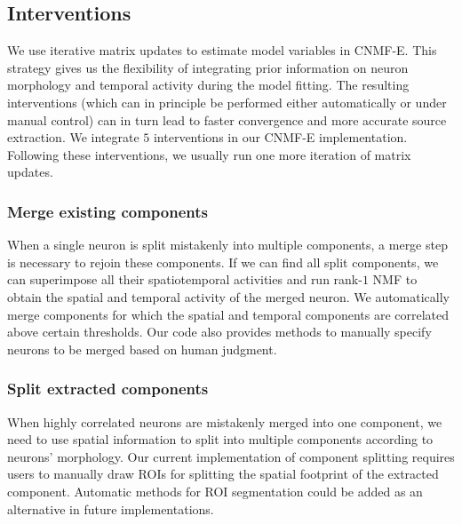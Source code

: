 \documentclass[9pt,lineno]{elife}
\begin{document}

\subsection{Interventions} 
We use iterative matrix updates to estimate model variables in CNMF-E. This strategy gives us the flexibility of integrating prior information on neuron morphology and temporal activity during the model fitting. The resulting interventions (which can in principle be performed either automatically or under manual control) can in turn lead to faster convergence and more accurate source extraction. We integrate $5$ interventions in our CNMF-E implementation. Following these interventions, we usually run one more iteration of matrix updates. 

\subsubsection{Merge existing components}
When a single neuron is split mistakenly into multiple components, a merge step is necessary to rejoin these components. If we can find all split components, we can superimpose all their spatiotemporal activities and run rank-$1$ NMF to obtain the spatial and temporal activity of the merged neuron. We automatically merge components for which the spatial and temporal components are correlated above certain thresholds. Our code also provides methods to manually specify neurons to be merged based on human judgment. 

\subsubsection{Split extracted components}
When highly correlated neurons are mistakenly merged into one component, we need to use spatial information to split into multiple components according to neurons' morphology.  Our current implementation of component splitting requires users to manually draw ROIs for splitting the spatial footprint of the extracted component. Automatic methods for ROI segmentation \citep{Apthorpe2016,Pachitariu2013} could be added as an alternative in future implementations.
\end{document}
